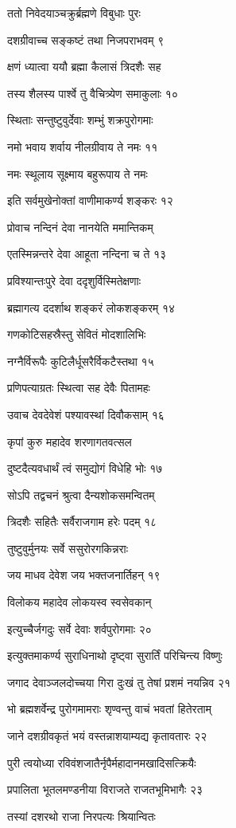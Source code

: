 ततो निवेदयाञ्चक्रुर्ब्रह्मणे विबुधाः पुरः

दशग्रीवाच्च सङ्कष्टं तथा निजपराभवम् ९

क्षणं ध्यात्वा ययौ ब्रह्मा कैलासं त्रिदशैः सह

तस्य शैलस्य पार्श्वे तु वैचित्र्येण समाकुलाः १०

स्थिताः सन्तुष्टुवुर्देवाः शम्भुं शक्रपुरोगमाः

नमो भवाय शर्वाय नीलग्रीवाय ते नमः ११

नमः स्थूलाय सूक्ष्माय बहुरूपाय ते नमः

इति सर्वमुखेनोक्तां वाणीमाकर्ण्य शङ्करः १२

प्रोवाच नन्दिनं देवा नानयेति ममान्तिकम्

एतस्मिन्नन्तरे देवा आहूता नन्दिना च ते १३

प्रविश्यान्तःपुरे देवा ददृशुर्विस्मितेक्षणाः

ब्रह्मागत्य ददर्शाथ शङ्करं लोकशङ्करम् १४

गणकोटिसहस्रैस्तु सेवितं मोदशालिभिः

नग्नैर्विरूपैः कुटिलैर्धूसरैर्विकटैस्तथा १५

प्रणिपत्याग्रतः स्थित्वा सह देवैः पितामहः

उवाच देवदेवेशं पश्यावस्थां दिवौकसाम् १६

कृपां कुरु महादेव शरणागतवत्सल

दुष्टदैत्यवधार्थं त्वं समुद्योगं विधेहि भोः १७

सोऽपि तद्वचनं श्रुत्वा दैन्यशोकसमन्वितम्

त्रिदशैः सहितैः सर्वैराजगाम हरेः पदम् १८

तुष्टुवुर्मुनयः सर्वे ससुरोरगकिन्नराः

जय माधव देवेश जय भक्तजनार्तिहन् १९

विलोकय महादेव लोकयस्व स्वसेवकान्

इत्युच्चैर्जगदुः सर्वे देवाः शर्वपुरोगमाः २०

इत्युक्तमाकर्ण्य सुराधिनाथो दृष्ट्वा सुरार्तिं परिचिन्त्य विष्णुः

जगाद देवाञ्जलदोच्चया गिरा दुःखं तु तेषां प्रशमं नयन्निव २१

भो ब्रह्मशर्वेन्द्र पुरोगमामराः शृण्वन्तु वाचं भवतां हितेरताम्

जाने दशग्रीवकृतं भयं वस्तन्नाशयाम्यद्य कृतावतारः २२

पुरी त्वयोध्या रविवंशजातैर्नृपैर्महादानमखादिसत्क्रियैः

प्रपालिता भूतलमण्डनीया विराजते राजतभूमिभागैः २३

तस्यां दशरथो राजा निरपत्यः श्रियान्वितः

